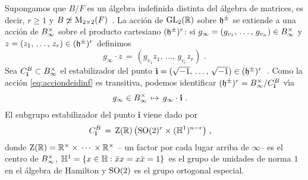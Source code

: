 Supongamos que $B/F$ es un \'{a}lgebra indefinida distinta del \'{a}lgebra
de matrices, es decir, $r\geq 1$ y
\begin{math}
	B\not\simeq\mathrm{M}_{2\times 2}(F)
\end{math}~.
La acci\'{o}n de $\mathrm{GL}_{2}(\mathbb{R})$ sobre $\mathfrak{h}^{\pm}$ se extiende a una
acci\'{o}n de ${B}_{\infty}^{\times}$ sobre el producto cartesiano $(\mathfrak{h}^{\pm})^{r}$: si
\begin{math}
	g_{\infty}=(\lista[v_{1}]{g}{v_{n}})\in\Idinf{B}
\end{math}
y $z=(\lista{z}{r})\in(\hP^{\pm})^{r}$ definimos
\begin{equation}
	\label{eq:acciondeidinf}
	g_{\infty}\cdot z \,=\, (g_{v_{1}}z_{1},\,\dots,\,g_{v_{r}}z_{r})
	\text{ .}
\end{equation}
%
Sea
\begin{math}
	C^{B}_{\mathbf{i}}\subset{B}_{\infty}^{\times}
\end{math}
el estabilizador del punto
\begin{math}
	\mathbf{i}=(\sqrt{-1},\,\dots,\,\sqrt{-1})\in(\mathfrak{h}^{\pm})^{r}
\end{math}~.
Como la acci\'{o}n \eqref{eq:acciondeidinf} es transitiva, podemos identificar
$(\mathfrak{h}^{\pm})^{r} ={B}_{\infty}^{\times}/C^{B}_{\mathbf{i}}$ v\'{\i}a
\begin{align*}
	& g_{\infty}\in{B}_{\infty}^{\times}\,\mapsto\, g_{\infty}\cdot\mathbf{i}
	\text{ .}
\end{align*}
%
El subgrupo estabilizador del punto $\mathbf{i}$ viene dado por
\begin{align*}
	C^{B}_{\mathbf{i}} & \,=\,\mathrm{Z}(\mathbb{R})\,
		\big( \mathrm{SO}(2)^{r}\times
		(\mathbb{H}^{1})^{n-r} \big)
	\text{ ,}
\end{align*}
%
donde
\begin{math}
	\mathrm{Z}(\mathbb{R})=\mathbb{R}^{\times}\times\,\cdots\,\times\mathbb{R}^{\times}
\end{math} --%
un factor por cada lugar arriba de $\infty$-- es el centro de ${B}_{\infty}^{\times}$,
\begin{math}
	\mathbb{H}^{1}=\{x\in\mathbb{H}:\bar{x}x=x\bar{x}=1\}
\end{math}~es el grupo de unidades de norma $1$ en el \'{a}lgebra de Hamilton
y $\mathrm{SO}(2)$ es el grupo ortogonal especial.

